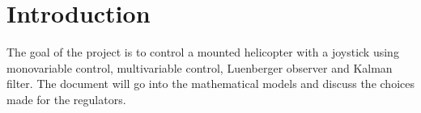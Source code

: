 \section{Introduction}
\vspace{1em}
The goal of the project is to control a mounted helicopter with a joystick using
monovariable control, multivariable control, Luenberger observer and Kalman filter.
The document
will go into the mathematical models and discuss the choices made for the regulators.
